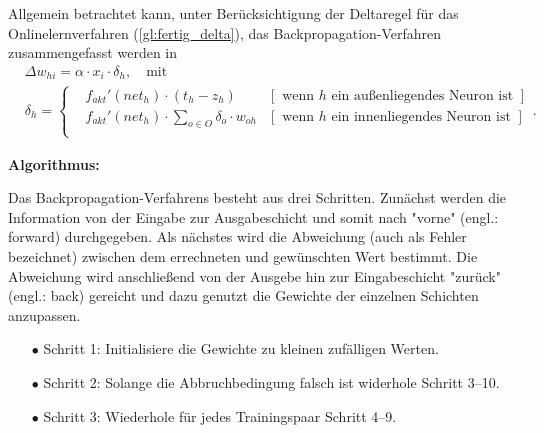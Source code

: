 Allgemein betrachtet kann, unter Berücksichtigung der Deltaregel für das Onlinelernverfahren (\autoref{gl:fertig_delta}), das Backpropagation-Verfahren zusammengefasst werden in\,
\begin{align}
\nonumber & \Delta w_{hi}  = \alpha \cdot x_{i} \cdot \delta_h, \quad \text{mit}\\
&\delta_h = \left \{
\begin{aligned}
&f_{akt}'(net_h) \cdot (t_h - z_h) &[\text{ wenn }  h \text{ ein au\ss enliegendes Neuron ist }]\\ 
&f_{akt}'(net_h) \cdot \sum\limits_{o \in O}  \delta_o \cdot w_{oh} &[\text{ wenn }  h \text{ ein innenliegendes Neuron ist }]\\
\end{aligned}
.
\right.
\label{gl:fertigbeide_bak}
\end{align}

\textbf{Algorithmus:}\,

Das  Backpropagation-Verfahrens besteht aus drei Schritten. Zunächst werden die Information von der Eingabe zur Ausgabeschicht und somit nach "vorne" (engl.: forward) durchgegeben. Als nächstes wird die Abweichung (auch als Fehler bezeichnet) zwischen dem errechneten und gewünschten Wert bestimmt. Die Abweichung wird anschließend von der Ausgebe hin zur Eingabeschicht "zurück" (engl.: back) gereicht und dazu genutzt die Gewichte der einzelnen Schichten anzupassen.

\begin{itemize}
\item[\textbf{$\bullet$}] Schritt 1: Initialisiere die Gewichte zu kleinen zufälligen Werten.
\item[\textbf{$\bullet$}] Schritt 2: Solange die Abbruchbedingung falsch ist widerhole Schritt 3--10.
\item[\textbf{$\bullet$}] Schritt 3: Wiederhole für jedes Trainingspaar Schritt 4--9.
\end{itemize}

